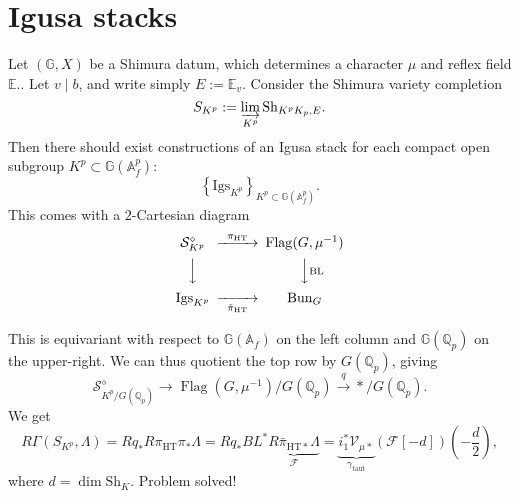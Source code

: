\documentclass[reqno]{amsart} 
\begin{document}
\section{Igusa stacks}
\begin{conjecture}[Scholze]
  Let $(\mathbb{G}, X)$ be a Shimura datum, which determines a character $\mu$ and reflex field $\mathbb{E}$..  Let $v \mid b$, and write simply $E := \mathbb{E}_v$.  Consider the Shimura variety completion
  \begin{equation*}
    S_{K^p} := \varinjlim_{K^p}
    \mathrm{Sh}_{K^p K_p, E}.
  \end{equation*}
  Then there should exist constructions of an Igusa stack for each compact open subgroup $K^p \subset \mathbb{G}(\mathbb{A}_f^p)$:
  \begin{equation*}
    \left\{ \mathrm{Igs}_{K^p} \right\}_{K^p \subset \mathbb{G}(\mathbb{A}_f^p)}.
  \end{equation*}
  This comes with a $2$-Cartesian diagram
  \begin{equation*}
    \begin{CD}         
      \mathcal{S}_{K^p}^{\diamond} @> \pi_{\mathrm{H T}}>> \operatorname{Flag}(G, \mu^{-1}) \\
      @VVV  @VV \mathrm{B L} V \\
      \mathrm{Igs}_{K^p} @>> \tilde{\pi}_{\mathrm{H T}}> \mathrm{Bun}_G\\
    \end{CD}
  \end{equation*}
\end{conjecture}
This is equivariant with respect to $\mathbb{G}(\mathbb{A}_f)$ on the left column and $\mathbb{G}(\mathbb{Q}_p)$ on the upper-right.  We can thus quotient the top row by $G(\mathbb{Q}_p)$, giving
\begin{equation*}
  \mathcal{S}_{K^p / G(\mathbb{Q}_p)}^{\diamond} \rightarrow \operatorname{Flag}(G, \mu^{-1}) / G(\mathbb{Q}_p) \xrightarrow{q} \ast / G(\mathbb{Q}_p).
\end{equation*}
We get
\begin{equation*}
  R \Gamma \left( S_{K^p}, \Lambda \right)
  = R q_\ast R \pi_{\mathrm{H T}} \pi_\ast \Lambda
  = R q_\ast B L^\ast \underbrace
  {
    R \bar{\pi}_{\mathrm{H T} \ast} \Lambda 
  }_{
    \mathcal{F}
  }
  =
  \underbrace
  {
    i_1^\ast \mathcal{V}_{\mu \ast }
  }_{
    \gamma_{\mathrm{taut}}
  }
  \left( \mathcal{F}[- d] \right) \left( - \frac{d}{2} \right),
\end{equation*}
where $d = \dim \mathrm{Sh}_K$.  Problem solved!
\end{document}
